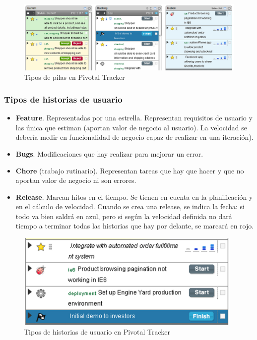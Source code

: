       \begin{figure}[H]
        \centering
          \includegraphics[width=15cm]{./eps/herramientas/pt/pt_pilas.eps}
        \caption{Tipos de pilas en Pivotal Tracker}
        \label{fig:pt_pilas}
      \end{figure}
      
  
    \subsubsection{Tipos de historias de usuario} %
    \label{ssub:tipos_de_historias_de_usuario}
      
      \begin{itemize}
        \item {\bf Feature}. Representadas por una estrella. Representan requisitos de usuario y las única que estiman (aportan valor de negocio al usuario). La velocidad se debería medir en funcionalidad de negocio capaz de realizar en una iteración).
        \item {\bf Bugs}. Modificaciones que hay realizar para mejorar un error.
        \item {\bf Chore} (trabajo rutinario). Representan tareas que hay que hacer y que no aportan valor de negocio ni son errores.
        \item {\bf Release}. Marcan hitos en el tiempo. Se tienen en cuenta en la planificación y en el cálculo de velocidad. Cuando se crea una release, se indica la fecha: si todo va bien saldrá en azul, pero si según la velocidad definida no dará tiempo a terminar todas las historias que hay por delante, se marcará en rojo.
      \end{itemize}
      
      \begin{figure}[H]
        \centering
          \includegraphics[width=11cm]{./eps/herramientas/pt/pt_historias.eps}
        \caption{Tipos de historias de usuario en Pivotal Tracker}
        \label{fig:pt_historias}
      \end{figure}
      
